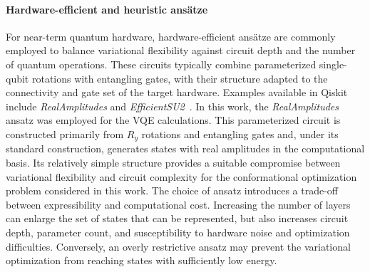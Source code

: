 \paragraph{Hardware-efficient and heuristic ansätze}
For near-term quantum hardware, hardware-efficient ansätze are commonly employed to balance variational flexibility against circuit depth and the number of quantum operations. These circuits typically combine parameterized single-qubit rotations with entangling gates, with their structure adapted to the connectivity and gate set of the target hardware. Examples available in Qiskit include \textit{RealAmplitudes} and \textit{EfficientSU2}~\cite{Qiskit}.
In this work, the \textit{RealAmplitudes} ansatz was employed for the VQE calculations. This parameterized circuit is constructed primarily from $R_y$ rotations and entangling gates and, under its standard construction, generates states with real amplitudes in the computational basis. Its relatively simple structure provides a suitable compromise between variational flexibility and circuit complexity for the conformational optimization problem considered in this work.
The choice of ansatz introduces a trade-off between expressibility and computational cost. Increasing the number of layers can enlarge the set of states that can be represented, but also increases circuit depth, parameter count, and susceptibility to hardware noise and optimization difficulties. Conversely, an overly restrictive ansatz may prevent the variational optimization from reaching states with sufficiently low energy.
